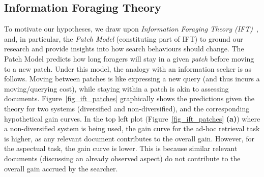 \subsection{Information Foraging Theory} \label{sec:ift}


To motivate our hypotheses, we draw upon \emph{Information Foraging Theory (IFT)}~\cite{pirolli1999ift}, and, in particular, the \textit{Patch Model} (constituting part of IFT) to ground our research and provide insights into how search behaviours should change. %
The Patch Model predicts how long foragers will stay in a given \emph{patch} before moving to a new patch. Under this model, the analogy with an information seeker is as follows. Moving between patches is like expressing a new query (and thus incurs a moving/querying cost), while staying within a patch is akin to assessing documents. 
Figure~\ref{fig_ift_patches} graphically shows the predictions given the theory for two systems (diversified and non-diversified), and the corresponding hypothetical gain curves. In the top left plot (Figure~\ref{fig_ift_patches} \textbf{(a)}) where a non-diversified system is being used, the gain curve for the ad-hoc retrieval task is higher, as any relevant document contributes to the overall gain. However, for the aspectual task, the gain curve is lower. This is because similar relevant documents (discussing an already observed aspect) do not contribute to the overall gain accrued by the searcher.

